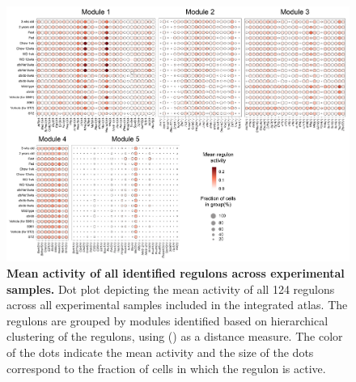 \begin{figure}[H]
\centering
\includegraphics[width=\linewidth]{Appendix2/Fig/F3-15-01.png}
\caption[Mean activity of all identified regulons across experimental samples]{\textbf{Mean activity of all identified regulons across experimental samples.} Dot plot depicting the mean activity of all 124 regulons across all experimental samples included in the integrated atlas. The regulons are grouped by modules identified based on hierarchical clustering of the regulons, using  () as a distance measure. The color of the dots indicate the mean activity and the size of the dots correspond to the fraction of cells in which the regulon is active.}
\label{fig:app_chp3_scenic_studies}
\end{figure}

